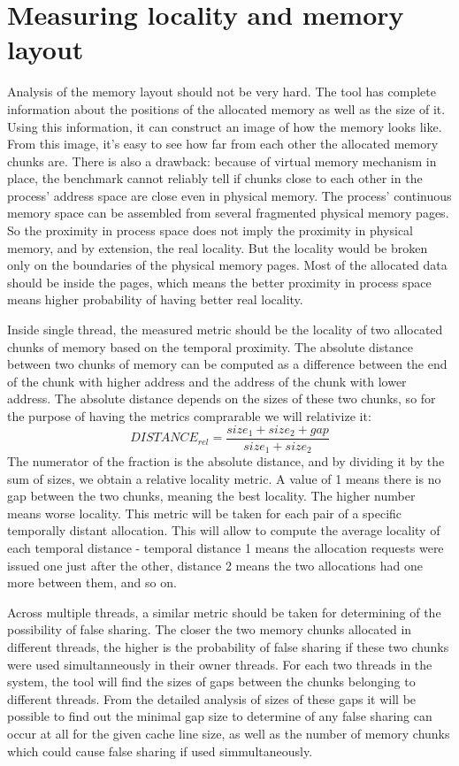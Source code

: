 \section{Measuring locality and memory layout}
\label{methodology:locality}

Analysis of the memory layout should not be very hard. The tool has complete information about the positions of the allocated memory as well as the size of it. Using this information, it can construct an image of how the memory looks like. From this image, it's easy to see how far from each other the allocated memory chunks are. There is also a drawback: because of virtual memory mechanism in place, the benchmark cannot reliably tell if chunks close to each other in the process' address space are close even in physical memory. The process' continuous memory space can be assembled from several fragmented physical memory pages. So the proximity in process space does not imply the proximity in physical memory, and by extension, the real locality. But the locality would be broken only on the boundaries of the physical memory pages. Most of the allocated data should be inside the pages, which means the better proximity in process space means higher probability of having better real locality.

Inside single thread, the measured metric should be the locality of two allocated chunks of memory based on the temporal proximity. The absolute distance between two chunks of memory can be computed as a difference between the end of the chunk with higher address and the address of the chunk with lower address. The absolute distance depends on the sizes of these two chunks, so for the purpose of having the metrics comprarable we will relativize it:
\begin{displaymath}
DISTANCE_{rel} = \frac{size_1 + size_2 + gap}{size_1 + size_2}
\end{displaymath}
The numerator of the fraction is the absolute distance, and by dividing it by the sum of sizes, we obtain a relative locality metric. A value of 1 means there is no gap between the two chunks, meaning the best locality. The higher number means worse locality. This metric will be taken for each pair of a specific temporally distant allocation. This will allow to compute the average locality of each temporal distance - temporal distance 1 means the allocation requests were issued one just after the other, distance 2 means the two allocations had one more between them, and so on.

Across multiple threads, a similar metric should be taken for determining of the possibility of false sharing. The closer the two memory chunks allocated in different threads, the higher is the probability of false sharing if these two chunks were used simultanneously in their owner threads. For each two threads in the system, the tool will find the sizes of gaps between the chunks belonging to different threads. From the detailed analysis of sizes of these gaps it will be possible to find out the minimal gap size to determine of any false sharing can occur at all for the given cache line size, as well as the number of memory chunks which could cause false sharing if used simmultaneously.

